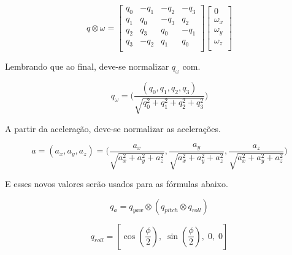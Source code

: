 \documentclass[a4paper, 12pt]{article}
\begin{document}
            \begin{equation}
                q \otimes \omega =
                    \begin{bmatrix}
                    q_0 & -q_1 & -q_2 & -q_3 \\
                    q_1 & q_0 & -q_3 & q_2 \\
                    q_2 & q_3 & q_0 & -q_1 \\
                    q_3 & -q_2 & q_1 & q_0 \\
                    \end{bmatrix}
                    \begin{bmatrix}
                    0 \\
                    \omega_x \\
                    \omega_y \\
                    \omega_z \\
                    \end{bmatrix}
            \end{equation}

            Lembrando que ao final, deve-se normalizar $q_\omega$ com.

            \begin{equation}
                q_\omega = \bigg(\frac{(q_0, q_1, q_2, q_3)}{\sqrt{q_0^2 + q_1^2 + q_2^2 + q_3^2}}\bigg)
            \end{equation}

            \noindent\ponto A partir da aceleração, deve-se normalizar as acelerações.

            \begin{equation}
                a = (a_x, a_y, a_z) = \bigg(\frac{a_x}{\sqrt{a_x^2 + a_y^2 + a_z^2}}, \frac{a_y}{\sqrt{a_x^2 + a_y^2 + a_z^2}}, \frac{a_z}{\sqrt{a_x^2 + a_y^2 + a_z^2}}\bigg)
            \end{equation}

            \noindent E esses novos valores serão usados para as fórmulas abaixo.

            \begin{equation}
                q_a = q_{yaw} \otimes (q_{pitch} \otimes q_{roll})
            \end{equation}
    
            \begin{equation}
                q_{roll} = \left[ \cos\left(\frac{\phi}{2}\right), \; \sin\left(\frac{\phi}{2}\right), \; 0, \; 0 \right]
            \end{equation}
\end{document}
